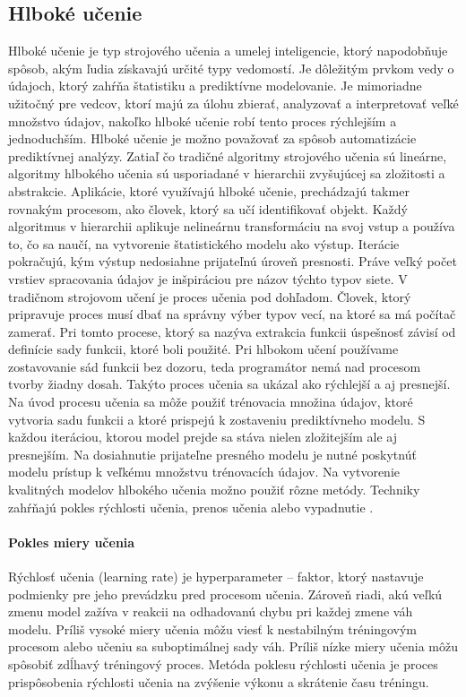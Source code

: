 \subsection{Hlboké učenie}
Hlboké učenie je typ strojového učenia a umelej inteligencie, ktorý napodobňuje spôsob, akým ľudia získavajú určité typy vedomostí. Je dôležitým prvkom vedy o údajoch, ktorý zahŕňa štatistiku a prediktívne modelovanie. Je mimoriadne užitočný pre vedcov, ktorí majú za úlohu zbierať, analyzovať a interpretovať veľké množstvo údajov, nakoľko hlboké učenie robí tento proces rýchlejším a jednoduchším.
Hlboké učenie je možno považovať za spôsob automatizácie prediktívnej analýzy. Zatiaľ čo tradičné algoritmy strojového učenia sú lineárne, algoritmy hlbokého učenia sú usporiadané v hierarchii zvyšujúcej sa zložitosti a abstrakcie.
Aplikácie, ktoré využívajú hlboké učenie, prechádzajú takmer rovnakým procesom, ako človek, ktorý sa učí identifikovať objekt. Každý algoritmus v hierarchii aplikuje nelineárnu transformáciu na svoj vstup a používa to, čo sa naučí, na vytvorenie štatistického modelu ako výstup. Iterácie pokračujú, kým výstup nedosiahne prijateľnú úroveň presnosti. Práve veľký počet vrstiev spracovania údajov je inšpiráciou pre názov týchto typov siete.
V tradičnom strojovom učení je proces učenia pod dohľadom. Človek, ktorý pripravuje proces musí dbať na správny výber typov vecí, na ktoré sa má počítač zamerať. Pri tomto procese, ktorý sa nazýva extrakcia funkcii úspešnosť závisí od definície sady funkcii, ktoré boli použité. Pri hlbokom učení používame zostavovanie sád funkcii bez dozoru, teda programátor nemá nad procesom tvorby žiadny dosah. Takýto proces učenia sa ukázal ako rýchlejší a aj presnejší.
Na úvod procesu učenia sa môže použiť trénovacia množina údajov, ktoré vytvoria sadu funkcii a ktoré prispejú k zostaveniu prediktívneho modelu. S každou iteráciou, ktorou model prejde sa stáva nielen zložitejším ale aj presnejším. Na dosiahnutie prijateľne presného modelu je nutné poskytnúť modelu prístup k veľkému množstvu trénovacích údajov.
Na vytvorenie kvalitných modelov hlbokého učenia možno použiť rôzne metódy. Techniky zahŕňajú pokles rýchlosti učenia, prenos učenia alebo vypadnutie \cite{deep_learning}.
\paragraph{Pokles miery učenia} Rýchlosť učenia (learning rate) je hyperparameter – faktor, ktorý nastavuje podmienky pre jeho prevádzku pred procesom učenia. Zároveň riadi, akú veľkú zmenu model zažíva v reakcii na odhadovanú chybu pri každej zmene váh modelu. Príliš vysoké miery učenia môžu viesť k nestabilným tréningovým procesom alebo učeniu sa suboptimálnej sady váh. Príliš nízke miery učenia môžu spôsobiť zdĺhavý tréningový proces. Metóda poklesu rýchlosti učenia je proces prispôsobenia rýchlosti učenia na zvýšenie výkonu a skrátenie času tréningu.
